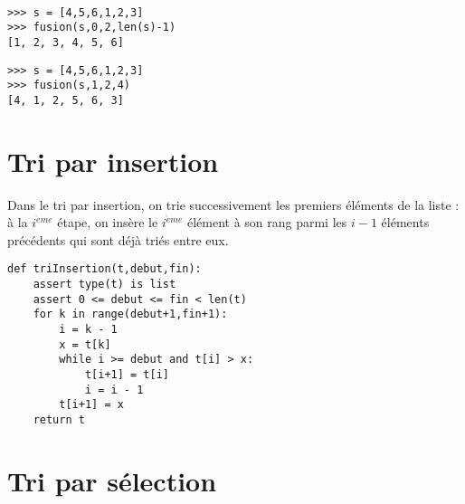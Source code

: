 \mbox{}\ \ \begin{py}{8cm}
\begin{verbatim}
>>> s = [4,5,6,1,2,3]
>>> fusion(s,0,2,len(s)-1)
[1, 2, 3, 4, 5, 6]
\end{verbatim}
\end{py}
\hfill
\begin{py}{5cm}
\begin{verbatim}
>>> s = [4,5,6,1,2,3]
>>> fusion(s,1,2,4)
[4, 1, 2, 5, 6, 3]
\end{verbatim}
\end{py}

\section*{Tri par insertion}

Dans le tri par insertion, on trie successivement les premiers éléments de la liste : à la
$i^{\grave eme}$ étape, on insère le $i^{\grave eme}$ élément à son rang parmi les $i-1$ éléments
précédents qui sont déjà triés entre eux.

\newpage
{}
\begin{lstlisting}[caption={\bf Tri par insertion},label=cl:triInsertion]
def triInsertion(t,debut,fin):
    assert type(t) is list
    assert 0 <= debut <= fin < len(t)
    for k in range(debut+1,fin+1):
        i = k - 1
        x = t[k]
        while i >= debut and t[i] > x:
            t[i+1] = t[i]
            i = i - 1
        t[i+1] = x
    return t
\end{lstlisting}

\section*{Tri par sélection}

